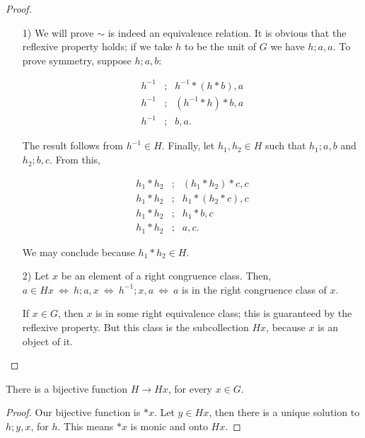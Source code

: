 \documentclass [12pt]{book}
\begin{document}
\begin{proof}\makebox[5pt][]{}\mbox {}
\begin{itemize}

\item[1)]We will prove $\sim$ is indeed an equivalence relation. It is obvious that the reflexive property holds; if we take $h$ to be the unit of $G$ we have $h;a,a$. To prove symmetry, suppose $h;a,b$:

\begin{eqnarray}\nonumber h^{-1}&;&h^{-1}*(h*b),a\\\nonumber h^{-1}&;&(h^{-1}*h)*b,a\\\nonumber h^{-1}&;&b,a.\end{eqnarray}

The result follows from $h^{-1}\in H$. Finally, let $h_{1},h_{2}\in H$ such that $h_{1};a,b$ and $h_{2};b,c$. From this,

\begin{eqnarray}\nonumber h_{1}*h_{2}&;&(h_{1}*h_{2})*c,c\\\nonumber h_{1}*h_{2}&;&h_{1}*(h_{2}*c),c\\\nonumber h_{1}*h_{2}&;&h_{1}*b,c\\\nonumber h_{1}*h_{2}&;&a,c.\end{eqnarray}

We may conclude because $h_{1}*h_{2}\in H$.

\item[2)] Let $x$ be an element of a right congruence class. Then, $a\in Hx~\Leftrightarrow ~h;a,x~\Leftrightarrow~h^{-1};x,a~\Leftrightarrow ~a$ is in the right congruence class of $x$.

If $x\in G$, then $x$ is in some right equivalence class; this is guaranteed by the reflexive property. But this class is the subcollection $Hx$, because $x$ is an object of it.

\end{itemize}
\end{proof}


\begin{theorem}There is a bijective function $H\rightarrow Hx$, for every $x\in G$.\end{theorem}

\begin{proof}Our bijective function is $*x$. Let $y\in Hx$, then there is a unique solution to $h;y,x$, for $h$. This means $*x$ is monic and onto $Hx$.

\end{proof}
\end{document}
